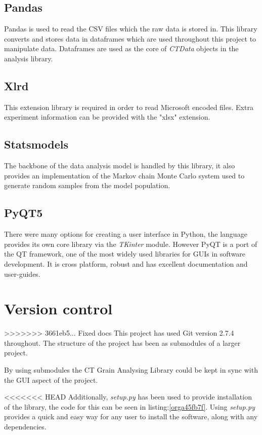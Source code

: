 \documentclass[11pt]{report}
\begin{document}
\subsection{Pandas}
\label{sec:org61f850a}
Pandas is used to read the CSV files which the raw data is stored in. This library converts and stores data in dataframes which are used throughout this project to manipulate data. Dataframes are used as the core of \emph{CTData} objects in the analysis library.
\subsection{Xlrd}
\label{sec:org866ce27}
This extension library is required in order to read Microsoft encoded files. Extra experiment information can be provided with the "xlsx" extension.
\subsection{Statsmodels}
\label{sec:org73ce8f6}
The backbone of the data analysis model is handled by this library, it also provides an implementation of the Markov chain Monte Carlo system used to generate random samples from the model population.
\subsection{PyQT5}
\label{sec:orgc74049b}
There were many options for creating a user interface in Python, the language provides its own core library via the \emph{TKinter} module. However PyQT is a port of the QT framework, one of the most widely used libraries for GUIs in software development. It is cross platform, robust and has excellent documentation and user-guides.

\section{Version control}
\label{sec:orgffe48fa}
>>>>>>> 3661eb5... Fixed docs
This project has used Git version 2.7.4 throughout. The structure of the project has been as submodules of a larger project.

By using submodules the CT Grain Analysing Library could be kept in sync with the GUI aspect of the project.

<<<<<<< HEAD
Additionally, \emph{setup.py} has been used to provide installation of the library, the code for this can be seen in listing:\ref{orga45fb7f}. Using \emph{setup.py} provides a quick and easy way for any user to install the software, along with any dependencies.
\end{document}
